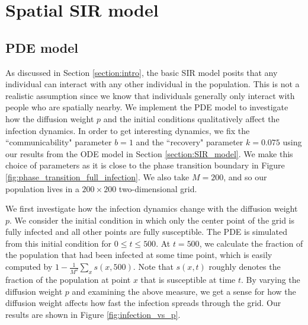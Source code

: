 \documentclass[12pt, reqno]{amsart}
\begin{document}

    \section{Spatial SIR model} \label{section:spatial_SIR}

    \subsection{PDE model} \label{section:spatial_SIR_pde}

    As discussed in Section \ref{section:intro}, the basic SIR model posits that any individual can interact with any other individual in the population. This is not a realistic assumption since we know that individuals generally only interact with people who are spatially nearby. We implement the PDE model to investigate how the diffusion weight \(p\) and the initial conditions qualitatively affect the infection dynamics. In order to get interesting dynamics, we fix the ``communicability" parameter \(b = 1\) and the ``recovery" parameter \(k = 0.075\) using our results from the ODE model in Section \ref{section:SIR_model}. We make this choice of parameters as it is close to the phase transition boundary in Figure \ref{fig:phase_transition_full_infection}. We also take \(M = 200\), and so our population lives in a \(200 \times 200\) two-dimensional grid.

    We first investigate how the infection dynamics change with the diffusion weight \(p\). We consider the initial condition in which only the center point of the grid is fully infected and all other points are fully susceptible. The PDE is simulated from this initial condition for \(0 \leq t \leq 500\). At \(t = 500\), we calculate the fraction of the population that had been infected at some time point, which is easily computed by \(1 - \frac{1}{M^2} \sum_{x} s(x, 500)\). Note that \(s(x,t)\) roughly denotes the fraction of the population at point \(x\) that is susceptible at time \(t\). By varying the diffusion weight \(p\) and examining the above measure, we get a sense for how the diffusion weight affects how fast the infection spreads through the grid. Our results are shown in Figure \ref{fig:infection_vs_p}.
    
\end{document}
